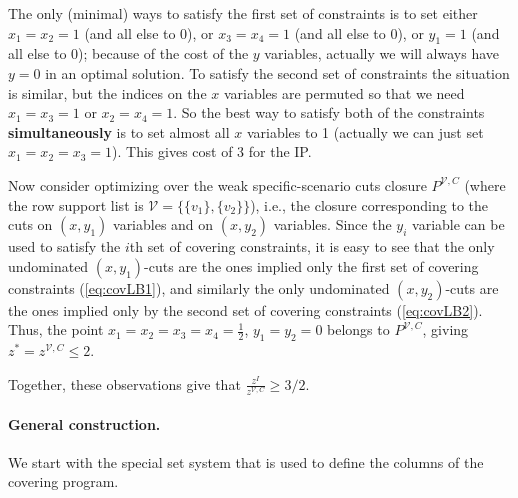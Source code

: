 \documentclass[smallextended]{svjour3}
\begin{document}
	The only (minimal) ways to satisfy the first set of constraints is to set either $x_1=x_2=1$ (and all else to 0), or $x_3=x_4=1$ (and all else to 0), or $y_1=1$ (and all else to 0); because of the cost of the $y$ variables, actually we will always have $y=0$ in an optimal solution. To satisfy the second set of constraints the situation is similar, but the indices on the $x$ variables are permuted so that we need $x_1=x_3=1$ or $x_2=x_4=1$. So the best way to satisfy both of the constraints \textbf{simultaneously} is to set almost all $x$ variables to 1 (actually we can just set $x_1=x_2=x_3=1$). This gives cost of 3 for the IP.

	Now consider optimizing over the weak specific-scenario cuts closure $P^{{{\mathcal{V}},C}}$ (where the row support list is ${\mathcal{V}} = \{ \{v_1\}, \{v_2\}\}$), i.e., the closure corresponding to the cuts on $(x,y_1)$ variables and on $(x, y_2)$ variables. Since the $y_i$ variable can be used to satisfy the $i$th set of covering constraints, it is easy to see that the only undominated $(x,y_1)$-cuts are the ones implied only the first set of covering constraints (\ref{eq:covLB1}), and similarly the only undominated $(x,y_2)$-cuts are the ones implied only by the second set of covering constraints (\ref{eq:covLB2}). Thus, the point  $x_1=x_2=x_3=x_4=\frac{1}{2}$, $y_1=y_2=0$ belongs to $P^{{{\mathcal{V}},C}}$, giving $z^{*}= z^{{\mathcal{V}}, C} \le 2$.
	
	Together, these observations give that $\frac{z^{I}}{z^{{\mathcal{V}}, C}} \ge 3/2$.

\paragraph{General construction.}

	We start with the special set system that is used to define the columns of the covering program.
	
\end{document}
